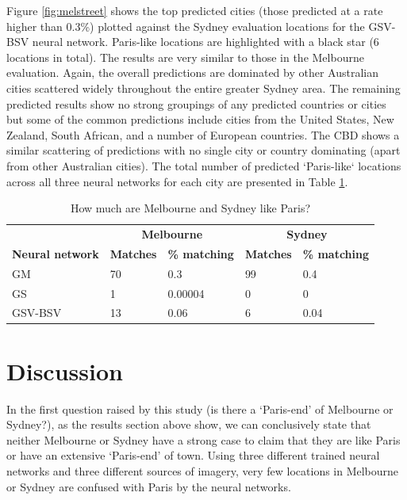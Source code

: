 \documentclass[sageh,times]{sagej}
\begin{document}
Figure \ref{fig:melstreet} shows the top predicted cities (those predicted at a rate higher than 0.3\%) plotted against the Sydney evaluation locations for the GSV-BSV neural network. Paris-like locations are highlighted with a black star (6 locations in total). The results are very similar to those in the Melbourne evaluation. Again, the overall predictions are dominated by other Australian cities scattered widely throughout the entire greater Sydney area. The remaining predicted results show no strong groupings of any predicted countries or cities but some of the common predictions include cities from the United States, New Zealand, South African, and a number of European countries. The CBD shows a similar scattering of predictions with no single city or country dominating (apart from other Australian cities). The total number of predicted `Paris-like` locations across all three neural networks for each city are presented in Table \ref{tab:melbournesydneyparis}.

\begin{table}[!htbp]
\caption{How much are Melbourne and Sydney like Paris? \label{tab:melbournesydneyparis}}     
\begin{tabular}{ l  l l l  l}
 \hline    &  \multicolumn{2}{c}{\textbf{Melbourne}} & \multicolumn{2}{c}{\textbf{Sydney}}  \\  
\textbf{Neural network} & \textbf{Matches} & \textbf{\% matching}  & \textbf{Matches} & \textbf{\% matching}\\ \hline
GM & 70 & 0.3 & 99 & 0.4 \\ 
GS & 1 & 0.00004 & 0 & 0 \\ 
GSV-BSV & 13 & 0.06 & 6 & 0.04 \\ \hline
\end{tabular}
\end{table}


\section{Discussion}\label{sec:discussion}


In the first question raised by this study (is there a `Paris-end' of Melbourne or Sydney?), as the results section above show, we can conclusively state that neither Melbourne or Sydney have a strong case to claim that they are like Paris or have an extensive `Paris-end' of town. Using three different trained neural networks and three different sources of imagery, very few locations in Melbourne or Sydney are confused with Paris by the neural networks. 
\end{document}
